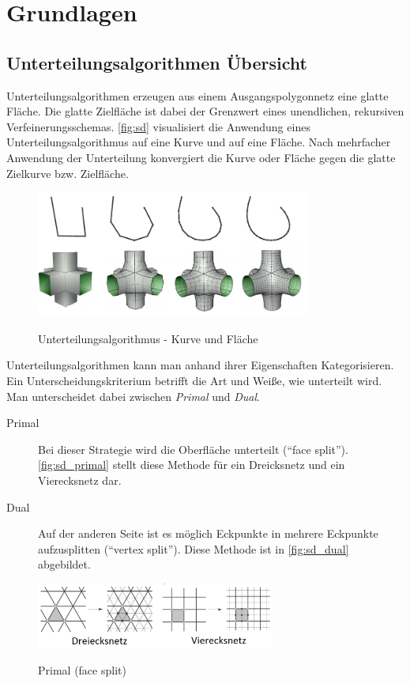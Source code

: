 \chapter{Grundlagen}


\section{Unterteilungsalgorithmen Übersicht}

Unterteilungsalgorithmen erzeugen aus einem Ausgangspolygonnetz eine glatte Fläche.
Die glatte Zielfläche ist dabei der Grenzwert eines unendlichen, rekursiven Verfeinerungsschemas.
\autoref{fig:sd} visualisiert die Anwendung eines Unterteilungsalgorithmus auf eine Kurve und auf eine Fläche.
Nach mehrfacher Anwendung der Unterteilung konvergiert die Kurve oder Fläche gegen die glatte Zielkurve bzw. Zielfläche.

\begin{figure}
  \caption{Unterteilungsalgorithmus - Kurve und Fläche \cite{Standford.24.07.2015}}
  \centering
  \includegraphics[width=0.8\textwidth]{content/media/sd.png}
  \label{fig:sd}
\end{figure}

Unterteilungsalgorithmen kann man anhand ihrer Eigenschaften Kategorisieren.
Ein Unterscheidungskriterium betrifft die Art und Weiße, wie unterteilt wird.
Man unterscheidet dabei zwischen \emph{Primal} und \emph{Dual}.

\begin{description}
 \item[Primal] Bei dieser Strategie wird die Oberfläche unterteilt (\enquote{face split}).
\autoref{fig:sd_primal} stellt diese Methode für ein Dreicksnetz und ein Vierecksnetz dar.
 \item[Dual] Auf der anderen Seite ist es möglich Eckpunkte in mehrere Eckpunkte aufzusplitten (\enquote{vertex split}).
 Diese Methode ist in \autoref{fig:sd_dual} abgebildet.

\end{description}
\begin{figure}
  \caption{Primal (face split) \cite{Standford.24.07.2015}}
  \centering
  \includegraphics[width=0.7\textwidth]{content/media/sd_primal}
  \label{fig:sd_primal}
\end{figure}


